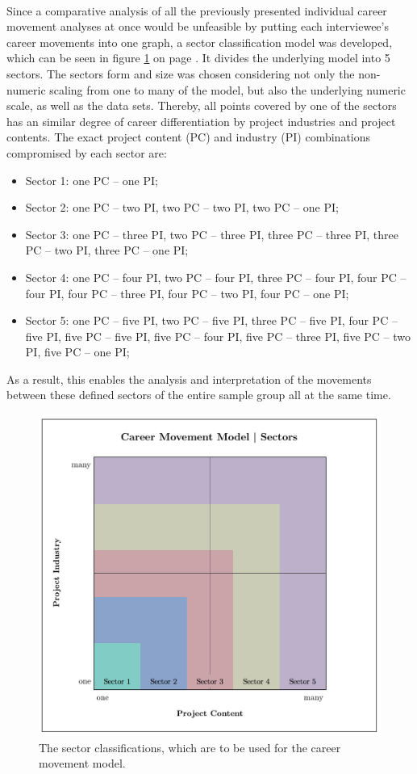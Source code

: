 \\[.1cm]
Since a comparative analysis of all the previously presented individual career movement analyses at once would be unfeasible by putting each interviewee's career movements into one graph, a sector classification model was developed, which can be seen in figure \ref{fig:sectors1} on page \pageref{fig:sectors1}. It divides the underlying model into 5 sectors. The sectors form and size was chosen considering not only the non-numeric scaling from one to many of the model, but also the underlying numeric scale, as well as the data sets. Thereby, all points covered by one of the sectors has an similar degree of career differentiation by project industries and project contents. The exact project content (PC) and industry (PI) combinations compromised by each sector are:
\begin{itemize}[noitemsep]
    \item Sector 1: one PC – one PI;
    \item Sector 2: one PC – two PI, two PC – two PI, two PC – one PI;
    \item Sector 3: one PC – three PI, two PC – three PI, three PC – three PI, three PC – two PI, three PC – one PI;
    \item Sector 4: one PC – four PI, two PC – four PI, three PC – four PI, four PC – four PI, four PC – three PI, four PC – two PI, four PC – one PI;
    \item Sector 5: one PC – five PI, two PC – five PI, three PC – five PI, four PC – five PI, five PC – five PI, five PC – four PI, five PC – three PI, five PC – two PI, five PC – one PI;
\end{itemize}
As a result, this enables the analysis and interpretation of the movements between these defined sectors of the entire sample group all at the same time. \\



\begin{figure}[hbt]
    \captionsetup{font=small}
  \centering
  \includegraphics[width=.5\columnwidth]{figures/Analysis_sectors1.png}
  \caption[The sector classifications]{The sector classifications, which are to be used for the career movement model.}
  \label{fig:sectors1}
\end{figure}

